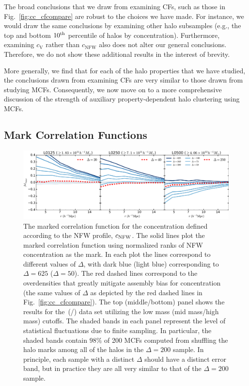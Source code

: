 \documentclass[usenatbib,fleqn]{mnras}
\begin{document}
The broad conclusions that we draw from examining CFs, such as those in Fig.~\ref{fig:cc_cfcompare} are robust to the choices we have made. For instance, we would draw the same conclusions by examining other halo subsamples (e.g., the top and bottom $10^{\rm{th}}$ percentile of halos by concentration). Furthermore, examining $c_{\mathrm{V}}$ rather than $c_{\mathrm{NFW}}$ also does not alter our general conclusions. Therefore, we do not show these additional results in the interest of brevity.

More generally, we find that for each of the halo properties that we have studied, 
the conclusions drawn from examining CFs are very similar to those drawn from 
studying MCFs. Consequently, we now move on to a more comprehensive discussion of the strength of auxiliary property-dependent halo clustering using MCFs. 

\subsection{Mark Correlation Functions}
\label{sub:mcfresults}

\begin{figure}
	\centering
	\includegraphics[width=\textwidth]{all_mcf_cNFW.pdf}
	\caption{
The marked correlation function for the concentration defined according to the NFW profile, $c_{\rm NFW}$. The solid lines plot the marked correlation function using normalized ranks of NFW concentration as the mark. In each plot the lines correspond to different values of $\Delta$, with dark blue (light blue) corresponding to $\Delta = 625$ ($\Delta = 50$). The red dashed lines correspond to the overdensities that greatly mitigate assembly bias for concentration (the same values of $\Delta$ as depicted by the red dashed lines in Fig.~\ref{fig:cc_cfcompare}). The top (middle/bottom) panel shows the results for the\simA \ (\simB /\simC) data set utilizing the low mass (mid mass/high mass) cutoffs. The shaded bands in each panel represent the level of statistical fluctuations due to finite sampling. In particular, the shaded bands contain $98\%$ of 200 MCFs computed from shuffling the halo marks among all of the halos in the $\Delta=200$ sample. In principle, each sample with a distinct $\Delta$ should have a distinct error band, but in practice they are all very similar to that of the $\Delta=200$ sample.
}
	\label{fig:cc_mcf_cnfw}
\end{figure}
\end{document}
